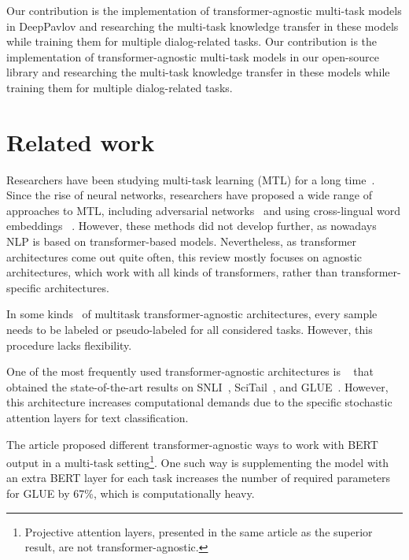 \ifinterspeechfinal
Our contribution is the implementation of transformer-agnostic multi-task models in DeepPavlov and researching the multi-task knowledge transfer in these models while training them for multiple dialog-related tasks.
\else
Our contribution is the implementation of transformer-agnostic multi-task models in our open-source library and researching the multi-task knowledge transfer in these models while training them for multiple dialog-related tasks.
\fi
\section{Related work}

Researchers have been studying multi-task learning (MTL) for a long time~\cite{caruana1997multi-task}. Since the rise of neural networks, researchers have proposed a wide range of approaches to MTL, including adversarial networks~\cite{wang-etal-2018-personalized} and using cross-lingual word embeddings~\cite{buryat} . However, these methods did not develop further, as nowadays NLP is based on transformer-based models. Nevertheless, as transformer architectures come out quite often, this review mostly focuses on agnostic architectures, which work with all kinds of transformers, rather than transformer-specific architectures.

In some kinds~\cite{pseudolabeling} of multitask transformer-agnostic architectures, every sample needs to be labeled or pseudo-labeled for all considered tasks. However, this procedure lacks flexibility.

One of the most frequently used transformer-agnostic architectures is ~\cite{MTDNN:19} that obtained the state-of-the-art results on SNLI~\cite{snli}, SciTail~\cite{khot2018scitail}, and GLUE~\cite{GLUE:19}. However, this architecture increases computational demands due to the specific stochastic attention layers for text classification.

The article \cite{PAL:19} proposed different transformer-agnostic ways to work with BERT output in a multi-task setting\footnote{Projective attention layers, presented in the same article as the superior result, are not transformer-agnostic.}. One such way is supplementing the model with an extra BERT layer for each task increases the number of required parameters for GLUE by 67\%, which is computationally heavy. 


